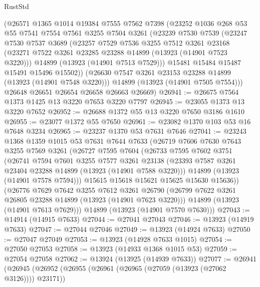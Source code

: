 \begin{lexlean}{RustStd}
\begin{coremodule}
    (@26571
      @1365
      @1014
      @19384
      @7555
      @7562
      @7398
      (@23252
        @1036
        @268
        @53
        @55
        @7541
        @7554
        @7561
        @3255
        @7504
        @3261
        (@23239
          @7530
          @7539
          (@23247
            @7530
            @7537
            @3689
            (@23257
              @7529
              @7536
              @3255
              @7512
              @3261
              @23168
              (@23271 @7522 @3261 @23285 @23288 @14899 (@13923 (@14901 @7523 @3220)))
              @14899
              (@13923 (@14901 @7513 @7529)))
            @15481
            @15484
            @15487
            @15491
            @15496
            @15502))
        (@26630 @7547 @3261 @23153 @23288 @14899 (@13923 (@14901 @7548 @3220)))
        @14899
        (@13923 (@14901 @7505 @7554)))
      @26648
      @26651
      @26654
      @26658
      @26663
      @26669)
@26941 := @26675 @7564 @1373 @1425 @13 @3220 @7653 @3220 @7797
@26945 := @23055 @1373 @13 @3220 @7652
@26952 := @26688 @1372 @55 @13 @3220 @7650 @3186 @1610
@26955 := @23077 @1372 @55 @7650
@26961 := @23082 @1370 @103 @53 @16 @7648 @3234
@26965 := @23237 @1370 @53 @7631 @7646
@27041 := @23243
    @1368
    @1359
    @1015
    @53
    @7631
    @7644
    @7633
    (@26719
      @7606
      @7630
      @7643
      @3255
      @7569
      @3261
      (@26727
        @7595
        @7604
        (@26733
          @7595
          @7602
          @3751
          (@26741
            @7594
            @7601
            @3255
            @7577
            @3261
            @23138
            (@23393 @7587 @3261 @23404 @23288 @14899 (@13923 (@14901 @7588 @3220)))
            @14899
            (@13923 (@14901 @7578 @7594)))
          @15615
          @15618
          @15621
          @15625
          @15630
          @15636))
      (@26776
        @7629
        @7642
        @3255
        @7612
        @3261
        @26790
        (@26799 @7622 @3261 @26805 @23288 @14899 (@13923 (@14901 @7623 @3220)))
        @14899
        (@13923 (@14901 @7613 @7629)))
      @14899
      (@13923 (@14901 @7570 @7630)))
@27043 := @14914 (@14915 @7633)
@27044 := @27041 @27043
@27046 := @13923 (@14919 @7633)
@27047 := @27044 @27046
@27049 := @13923 (@14924 @7633)
@27050 := @27047 @27049
@27053 := @13923 (@14928 @7633 @1015)
@27054 := @27050 @27053
@27058 := @13923 (@14933 @1368 @1015 @53)
@27059 := @27054 @27058
@27062 := @13924 (@13925 (@14939 @7633))
@27077 := @26941
    (@26945
      (@26952
        (@26955 (@26961 (@26965 (@27059 (@13923 (@27062 @3126)))) @23171))

\end{coremodule}
\end{lexlean}
